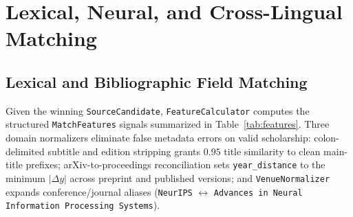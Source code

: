 \section{Lexical, Neural, and Cross-Lingual Matching}

\subsection{Lexical and Bibliographic Field Matching}

Given the winning \texttt{SourceCandidate}, \texttt{FeatureCalculator} computes the structured \texttt{MatchFeatures} signals summarized in Table~\ref{tab:features}. Three domain normalizers eliminate false metadata errors on valid scholarship: colon-delimited subtitle and edition stripping grants $0.95$ title similarity to clean main-title prefixes; arXiv-to-proceedings reconciliation sets \texttt{year\_distance} to the minimum $|\Delta y|$ across preprint and published versions; and \texttt{VenueNormalizer} expands conference/journal aliases (\texttt{NeurIPS} $\leftrightarrow$ \texttt{Advances in Neural Information Processing Systems}).

